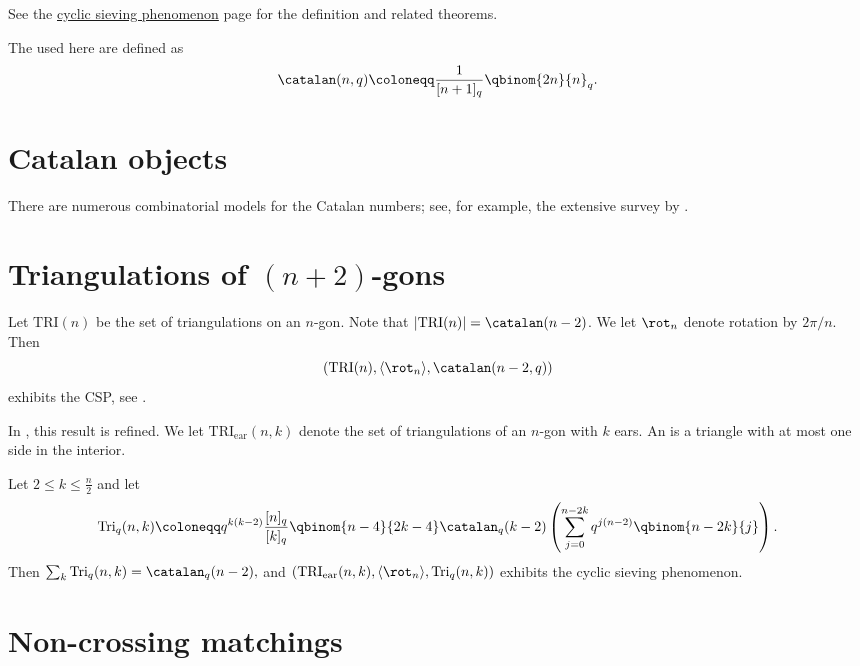 
See the \hyperref[cyclicSieving]{cyclic sieving phenomenon}
page for the definition and related theorems.

The \label{qCatalanNumberCSP} used here are
defined as
\[
\catalan(n,q) \coloneqq \frac{1}{[n+1]_q}\qbinom{2n}{n}_q.
\]

\section[cspCatalan]{Catalan objects}

There are numerous combinatorial models for the Catalan numbers; see, for
example, the extensive survey by  \cite{StanleyCatalan}.


\section[cspCatalanTriangulations]{Triangulations of $(n+2)$-gons}

Let $\mathrm{TRI}(n)$ be the set of triangulations on an $n$-gon.
Note that $|\mathrm{TRI}(n)| = \catalan(n-2)$.
We let $\rot_{n}$ denote rotation by $2\pi/n$.
Then
\[
\left( \mathrm{TRI}(n), \langle \rot_{n} \rangle,  \catalan(n-2,q) \right)
\]
exhibits the CSP, see \cite{ReinerStantonWhite2004}.



In \cite[Thm.~8.2]{AlexanderssonLinussonPotkaUhlin2021}, this result is
refined.  We let $\mathrm{TRI}_{\mathrm{ear}}(n,k)$ denote the set of
triangulations of an $n$-gon with $k$ ears.
An \label{polygonTriangulationEar} is a triangle with at most one
side in the interior.
\begin{theorem}
Let $2 \leq k \leq \frac{n}{2}$ and let
\begin{equation*}
\mathrm{Tri}_q(n,k) \coloneqq
q^{k(k-2)} \frac{[n]_q}{[k]_q} \qbinom{n-4}{2k-4}\catalan_q(k-2)
\left( \sum_{j=0}^{n-2k} q^{j(n-2)}\qbinom{n-2k}{j}\right).
\end{equation*}
Then $\sum_k \mathrm{Tri}_q(n,k) = \catalan_q(n-2),$ and
$
\left(
\mathrm{TRI}_{\mathrm{ear}}(n,k), \langle \rot_n \rangle, \mathrm{Tri}_q(n,k)
\right)
$
exhibits the cyclic sieving phenomenon.
\end{theorem}



\section[cspNonCrossingMatchingsI]{Non-crossing matchings}

